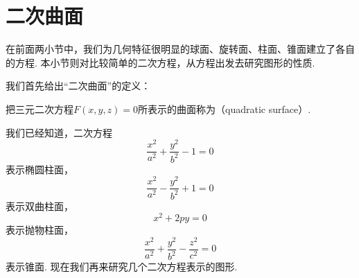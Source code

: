 \section{二次曲面}
在前面两小节中，我们为几何特征很明显的球面、旋转面、柱面、锥面建立了各自的方程.
本小节则对比较简单的二次方程，从方程出发去研究图形的性质.

我们首先给出“二次曲面”的定义：
\begin{definition}
把三元二次方程\(F(x,y,z)=0\)所表示的曲面称为（quadratic surface）.
\end{definition}

我们已经知道，二次方程\begin{equation*}
	\frac{x^2}{a^2}+\frac{y^2}{b^2}-1=0
\end{equation*}表示椭圆柱面，
\begin{equation*}
	\frac{x^2}{a^2}-\frac{y^2}{b^2}+1=0
\end{equation*}表示双曲柱面，
\begin{equation*}
	x^2+2py=0
\end{equation*}表示抛物柱面，
\begin{equation*}
	\frac{x^2}{a^2}+\frac{y^2}{b^2}-\frac{z^2}{c^2}=0
\end{equation*}表示锥面.
现在我们再来研究几个二次方程表示的图形.


